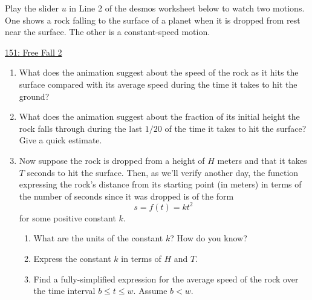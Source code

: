 \documentclass{ximera}
\begin{document}
\begin{question} \label{Qd90t90ette}
Play the slider $u$ in Line 2 of the desmos worksheet below to watch two motions. One shows a rock falling to the surface of a planet when it is dropped from rest near the surface. The other is a constant-speed motion.

\begin{onlineOnly}
    \begin{center}
\end{center}
\end{onlineOnly}

\href{https://www.desmos.com/calculator/dmlrxahkld}{151: Free Fall 2}

\begin{enumerate}

\item What does the animation suggest about the speed of the rock as it hits the surface compared with its average speed during the time it takes to hit the ground?

\item What does the animation suggest about the fraction of its initial height the rock falls through during the last $1/20$ of the time it takes to hit the surface? Give a quick estimate.

\item Now suppose the rock is dropped from a height of $H$ meters and that it takes $T$ seconds to hit the surface. Then, as we'll verify another day, the function expressing the rock's distance from its starting point (in meters) in terms of the number of seconds since it was dropped is of the form
\[
      s = f(t) = kt^2 \
\]  
for some positive constant $k$.

\begin{enumerate}

\item What are the units of the constant $k$? How do you know?

\item Express the constant $k$ in terms of $H$ and $T$. 




\item Find a fully-simplified expression for the average speed of the rock over the time interval $b\leq t \leq w$. Assume $b<w$.


\end{enumerate}
\end{enumerate}
\end{question}
\end{document}
